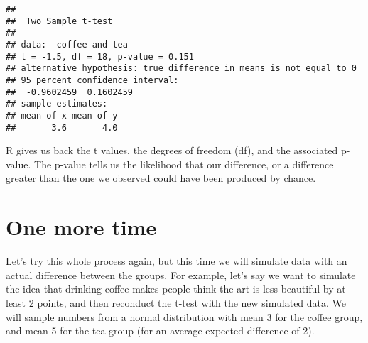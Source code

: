 \begin{Shaded}
\begin{Highlighting}[]
\NormalTok{)}
\end{Highlighting}
\end{Shaded}

\begin{verbatim}
## 
##  Two Sample t-test
## 
## data:  coffee and tea
## t = -1.5, df = 18, p-value = 0.151
## alternative hypothesis: true difference in means is not equal to 0
## 95 percent confidence interval:
##  -0.9602459  0.1602459
## sample estimates:
## mean of x mean of y 
##       3.6       4.0
\end{verbatim}

R gives us back the t values, the degrees of freedom (df), and the
associated p-value. The p-value tells us the likelihood that our
difference, or a difference greater than the one we observed could have
been produced by chance.

\section{One more time}\label{one-more-time}

Let's try this whole process again, but this time we will simulate data
with an actual difference between the groups. For example, let's say we
want to simulate the idea that drinking coffee makes people think the
art is less beautiful by at least 2 points, and then reconduct the
t-test with the new simulated data. We will sample numbers from a normal
distribution with mean 3 for the coffee group, and mean 5 for the tea
group (for an average expected difference of 2).

\begin{Shaded}
\begin{Highlighting}[]
\NormalTok{(}\NormalTok{(}\NormalTok{,}\NormalTok{))}
\NormalTok{(}\NormalTok{(}\NormalTok{,}\NormalTok{))}
\NormalTok{)}
\end{Highlighting}
\end{Shaded}

